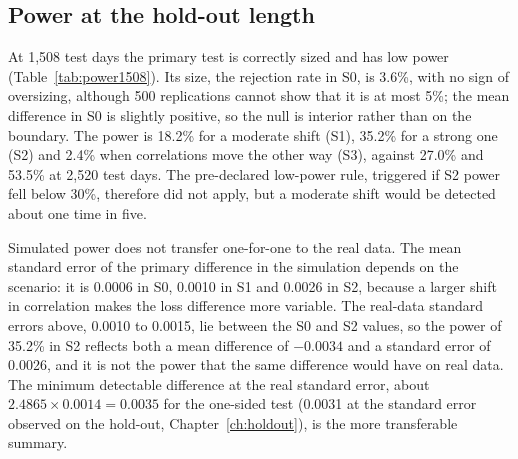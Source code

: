 

\subsection{Power at the hold-out length}\label{sec:power-results}

At 1,508 test days the primary test is correctly sized and has low power (Table~\ref{tab:power1508}). Its size, the rejection rate in S0, is 3.6\%, with no sign of oversizing, although 500 replications cannot show that it is at most 5\%; the mean difference in S0 is slightly positive, so the null is interior rather than on the boundary. The power is 18.2\% for a moderate shift (S1), 35.2\% for a strong one (S2) and 2.4\% when correlations move the other way (S3), against 27.0\% and 53.5\% at 2,520 test days. The pre-declared low-power rule, triggered if S2 power fell below 30\%, therefore did not apply, but a moderate shift would be detected about one time in five.



Simulated power does not transfer one-for-one to the real data. The mean standard error of the primary difference in the simulation depends on the scenario: it is 0.0006 in S0, 0.0010 in S1 and 0.0026 in S2, because a larger shift in correlation makes the loss difference more variable. The real-data standard errors above, 0.0010 to 0.0015, lie between the S0 and S2 values, so the power of 35.2\% in S2 reflects both a mean difference of $-0.0034$ and a standard error of 0.0026, and it is not the power that the same difference would have on real data. The minimum detectable difference at the real standard error, about $2.4865\times0.0014=0.0035$ for the one-sided test (0.0031 at the standard error observed on the hold-out, Chapter~\ref{ch:holdout}), is the more transferable summary.
